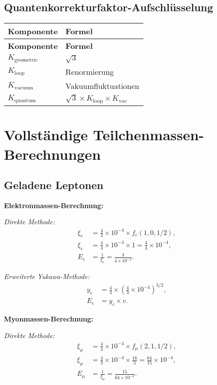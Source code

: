 \documentclass[12pt,a4paper]{article}
\begin{document}
	\subsection{Quantenkorrekturfaktor-Aufschlüsselung}
	\begin{longtable}{|p{5cm}|p{6cm}|}
		\hline
		\textbf{Komponente} & \textbf{Formel} \\
		\hline
		\endfirsthead
		\hline
		\textbf{Komponente} & \textbf{Formel} \\
		\hline
		\endhead
		$K_{\text{geometric}}$ & $\sqrt{3}$ \\
		\hline
		$K_{\text{loop}}$ & Renormierung \\
		\hline
		$K_{\text{vacuum}}$ & Vakuumfluktuationen \\
		\hline
		$K_{\text{quantum}}$ & $\sqrt{3} \times K_{\text{loop}} \times K_{\text{vac}}$ \\
		\hline
	\end{longtable}
	
	\section{Vollständige Teilchenmassen-Berechnungen}
	\subsection{Geladene Leptonen}
	
	\textbf{Elektronmassen-Berechnung:}
	
	\textit{Direkte Methode:}
	\begin{align}
		\xi_e &= \frac{4}{3} \times 10^{-4} \times f_e(1,0,1/2), \\
		\xi_e &= \frac{4}{3} \times 10^{-4} \times 1 = \frac{4}{3} \times 10^{-4}, \\
		E_e &= \frac{1}{\xi_e} = \frac{3}{4 \times 10^{-4}}.
	\end{align}
	
	\textit{Erweiterte Yukawa-Methode:}
	\begin{align}
		y_e &= \frac{4}{3} \times \left(\frac{4}{3} \times 10^{-4}\right)^{3/2}, \\
		E_e &= y_e \times v.
	\end{align}
	
	\textbf{Myonmassen-Berechnung:}
	
	\textit{Direkte Methode:}
	\begin{align}
		\xi_\mu &= \frac{4}{3} \times 10^{-4} \times f_\mu(2,1,1/2), \\
		\xi_\mu &= \frac{4}{3} \times 10^{-4} \times \frac{16}{5} = \frac{64}{15} \times 10^{-4}, \\
		E_{\mu} &= \frac{1}{\xi_\mu} = \frac{15}{64 \times 10^{-4}}.
	\end{align}
	
\end{document}
